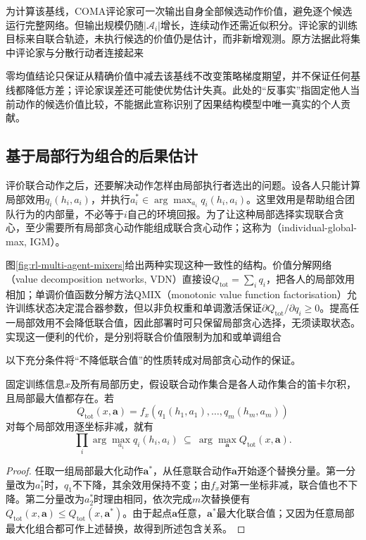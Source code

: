 为计算该基线，COMA评论家可一次输出自身全部候选动作价值，避免逐个候选运行完整网络。但输出规模仍随$|\mathcal A_i|$增长，连续动作还需近似积分。评论家的训练目标来自联合轨迹，未执行候选的价值仍是估计，而非新增观测。原方法据此将集中评论家与分散行动者连接起来

零均值结论只保证从精确价值中减去该基线不改变策略梯度期望，并不保证任何基线都降低方差；评论家误差还可能使优势估计失真。此处的“反事实”指固定他人当前动作的候选价值比较，不能据此宣称识别了因果结构模型中唯一真实的个人贡献。

\subsection{基于局部行为组合的后果估计}
\label{sec:rl-multi-agent-factorization}

评价联合动作之后，还要解决动作怎样由局部执行者选出的问题。设各人只能计算局部效用$q_i(h_i,a_i)$，并执行$a_i^*\in\arg\max_{a_i}q_i(h_i,a_i)$。这里效用是帮助组合团队行为的内部量，不必等于$i$自己的环境回报。为了让这种局部选择实现联合贪心，至少需要所有局部贪心动作能组成联合贪心动作；这称为（individual-global-max, IGM）。

图\ref{fig:rl-multi-agent-mixers}给出两种实现这种一致性的结构。价值分解网络（value decomposition networks, VDN）直接设$Q_{\text{tot}}=\sum_i q_i$，把各人的局部效用相加；单调价值函数分解方法QMIX（monotonic value function factorisation）允许训练状态决定混合器参数，但以非负权重和单调激活保证$\partial Q_{\text{tot}}/\partial q_i\geq0$。提高任一局部效用不会降低联合值，因此部署时可只保留局部贪心选择，无须读取状态。实现这一便利的代价，是分别将联合价值限制为加和或单调组合

以下充分条件将“不降低联合值”的性质转成对局部贪心动作的保证。

\begin{theorem}[单调组合的局部贪心充分性]
\label{thm:rl-multi-agent-monotone}
固定训练信息$x$及所有局部历史，假设联合动作集合是各人动作集合的笛卡尔积，且局部最大值都存在。若
\[
 Q_{\text{tot}}(x,\bm a)
 =f_x(q_1(h_1,a_1),\ldots,q_m(h_m,a_m))
\]
对每个局部效用逐坐标非减，就有
\[
 \prod_i\arg\max_{a_i}q_i(h_i,a_i)
 \ \subseteq\ \arg\max_{\bm a}Q_{\text{tot}}(x,\bm a).
\]
\end{theorem}
\begin{proof}
任取一组局部最大化动作$\bm a^*$，从任意联合动作$\bm a$开始逐个替换分量。第一分量改为$a_1^*$时，$q_1$不下降，其余效用保持不变；由$f_x$对第一坐标非减，联合值也不下降。第二分量改为$a_2^*$时理由相同，依次完成$m$次替换便有
$Q_{\text{tot}}(x,\bm a)\leq Q_{\text{tot}}(x,\bm a^*)$。由于起点$\bm a$任意，$\bm a^*$最大化联合值；又因为任意局部最大化组合都可作上述替换，故得到所述包含关系。
\end{proof}

